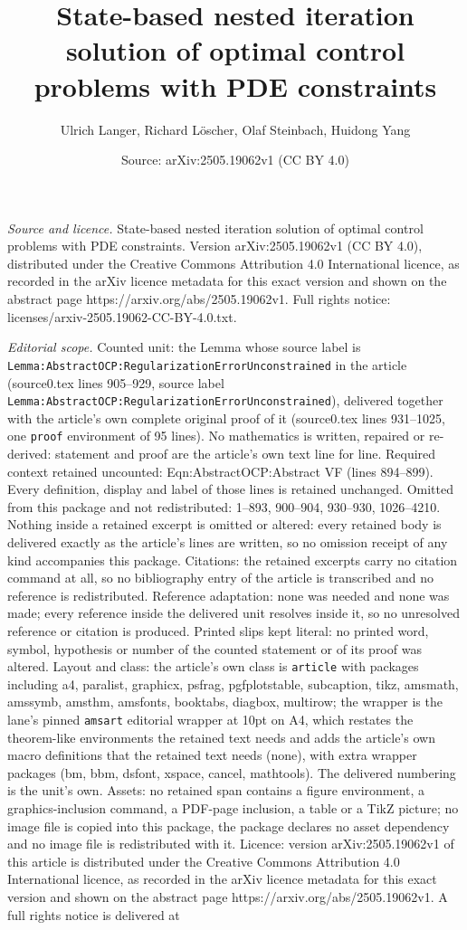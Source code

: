 \documentclass[10pt,a4paper]{amsart}
\title[State-based nested iteration solution of optimal control pro]{State-based nested iteration solution of optimal control problems with PDE constraints}
\author{Ulrich Langer, Richard L\"oscher, Olaf Steinbach, Huidong Yang}
\date{Source: arXiv:2505.19062v1 (CC BY 4.0)}
\begin{document}
\maketitle

\noindent\emph{Source and licence.} State-based nested iteration solution of optimal control problems with PDE constraints. Version arXiv:2505.19062v1 (CC BY 4.0), distributed under the Creative Commons Attribution 4.0 International licence, as recorded in the arXiv licence metadata for this exact version and shown on the abstract page https://arxiv.org/abs/2505.19062v1. Full rights notice: licenses/arxiv-2505.19062-CC-BY-4.0.txt.\par\smallskip

\noindent\textit{Editorial scope.} Counted unit: the Lemma whose source label is \texttt{Lemma:AbstractOCP:RegularizationErrorUnconstrained} in the article (source0.tex lines 905--929, source label \texttt{Lemma:AbstractOCP:RegularizationErrorUnconstrained}), delivered together with the article's own complete original proof of it (source0.tex lines 931--1025, one \texttt{proof} environment of 95 lines). No mathematics is written, repaired or re-derived: statement and proof are the article's own text line for line. Required context retained uncounted: Eqn:AbstractOCP:Abstract VF (lines 894--899). Every definition, display and label of those lines is retained unchanged. Omitted from this package and not redistributed: 1--893, 900--904, 930--930, 1026--4210. Nothing inside a retained excerpt is omitted or altered: every retained body is delivered exactly as the article's lines are written, so no omission receipt of any kind accompanies this package. Citations: the retained excerpts carry no citation command at all, so no bibliography entry of the article is transcribed and no reference is redistributed. Reference adaptation: none was needed and none was made; every reference inside the delivered unit resolves inside it, so no unresolved reference or citation is produced. Printed slips kept literal: no printed word, symbol, hypothesis or number of the counted statement or of its proof was altered. Layout and class: the article's own class is \texttt{article} with packages including a4, paralist, graphicx, psfrag, pgfplotstable, subcaption, tikz, amsmath, amssymb, amsthm, amsfonts, booktabs, diagbox, multirow; the wrapper is the lane's pinned \texttt{amsart} editorial wrapper at 10pt on A4, which restates the theorem-like environments the retained text needs and adds the article's own macro definitions that the retained text needs (none), with extra wrapper packages (bm, bbm, dsfont, xspace, cancel, mathtools). The delivered numbering is the unit's own. Assets: no retained span contains a figure environment, a graphics-inclusion command, a PDF-page inclusion, a table or a TikZ picture; no image file is copied into this package, the package declares no asset dependency and no image file is redistributed with it. Licence: version arXiv:2505.19062v1 of this article is distributed under the Creative Commons Attribution 4.0 International licence, as recorded in the arXiv licence metadata for this exact version and shown on the abstract page https://arxiv.org/abs/2505.19062v1. A full rights notice is delivered at 
\end{document}
